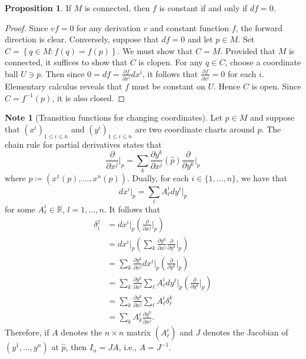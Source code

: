 \documentclass[10pt,letterpaper,cm]{nupset}
\theoremstyle{definition}
\newtheorem{note}[definition]{Note}
\theoremstyle{theorem}
\newtheorem{prop}[definition]{Proposition}
\theoremstyle{remark}
\newcommand{\R}{\mathbb R}
\newcommand{\1}{\mathbf{1}}
\newcommand{\0}{\vec 0}
\begin{document}
\begin{prop}
If $M$ is connected, then $f$ is constant if and only if $df = 0$. 
\end{prop}
\begin{proof}
Since $vf = 0$ for any derivation $v$ and constant function $f$, the forward direction is clear. Conversely, suppose that $df = 0$ and let $p\in M$. Set $C = \left\{q \in M : f(q) = f(p)\right\}$. We must show that $C = M$. Provided that $M$ is connected, it suffices to show that $C$ is clopen. For any $q\in C$, choose a coordinate ball $U\ni p$. Then since $0 = df = \frac{\partial{f}}{\partial{x^i}}dx^i$, it follows that $\frac{\partial{f}}{\partial{x^i}} = 0$ for each $i$. Elementary calculus reveals that $f$ must be constant on $U$. Hence $C$ is open. Since $C = f^{-1}(p)$, it is also closed.
\end{proof}

\begin{note}[Transition functions for changing coordinates]
Let $p\in M$ and suppose that $\left(x^i\right)_{1\leq i \leq n}$ and $\left(y^i\right)_{1\leq i \leq n}$ are two coordinate charts around $p$. The chain rule for partial derivatives states that
\[
 \frac{\partial}{\partial{x^j}}\bigr\rvert_p =   \sum_k\frac{\partial y^{k}}{\partial x^{j}}(\hat{p}) \frac{\partial}{\partial y^{k}}\bigr\rvert_p
\] where $\hat{p} \coloneqq \left(x^1(p), \ldots, x^n(p)\right)$.  Dually, for each $i \in \{1, \ldots, n\}$, we have that
\[
d{x^i}\bigr\rvert_p = \sum_{\ell} A_{\ell}^id{y^{\ell}}\bigr\rvert_p
\] for some $A^i_{\ell} \in \R$, $l =1, \ldots, n$. It follows  that
\begin{align*}
 \delta_i^j 
 &=d x^{i}\bigr\rvert_{p}\left(\frac{\partial}{\partial x^{j}}\bigr\rvert_{p}\right) 
 \\ &=d x^{i}\bigr\rvert_{p}\left(\sum_{k} \frac{\partial y^{k}}{\partial x^{j}} \frac{\partial}{\partial y^{k}}\bigr\rvert_{p}\right) 
 \\ &=\sum_{k} \frac{\partial y^{k}}{\partial x^{j}} d x^{i}\bigr\rvert_{p}\left(\frac{\partial}{\partial y^{k}}\bigr\rvert_{ p }\right)
\\ & = 
\sum_{k} \frac{\partial y^{k}}{\partial x^{j}} \sum_{\ell} A_{\ell}^{i} d y^{\ell}\bigr\rvert_{p}\left(\frac{\partial}{\partial y^{k}}\bigr\rvert_{ p }\right)
\\ & = \sum_{k} \frac{\partial y^{k}}{\partial x^{j}} \sum_{\ell} A_{\ell}^{i} \delta_{\ell}^k
\\ &  =\sum_{k} A_{k}^{i}\frac{\partial y^{k}}{\partial x^{j}}
. \end{align*} 
Therefore, if $A$ denotes the $n\times n$ matrix $\left(A_{\ell}^i\right)$ and $J$ denotes the Jacobian of $\left(y^1, \ldots, y^n\right)$ at $\hat{p}$, then $I_n = JA$, i.e., $A = J^{-1}$.
\end{note}
\end{document}
